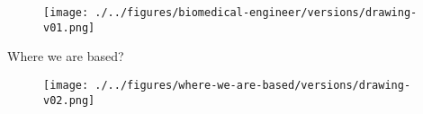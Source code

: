 {
\begin{frame}{}

  \begin{figure}
  \centering
  \texttt{[image: ./../figures/biomedical-engineer/versions/drawing-v01.png]}
  \end{figure}

\end{frame}
}




{
\begin{frame}{Where we are based?}

  \begin{figure}
  \centering
  \texttt{[image: ./../figures/where-we-are-based/versions/drawing-v02.png]}
  \end{figure}

\end{frame}
}
